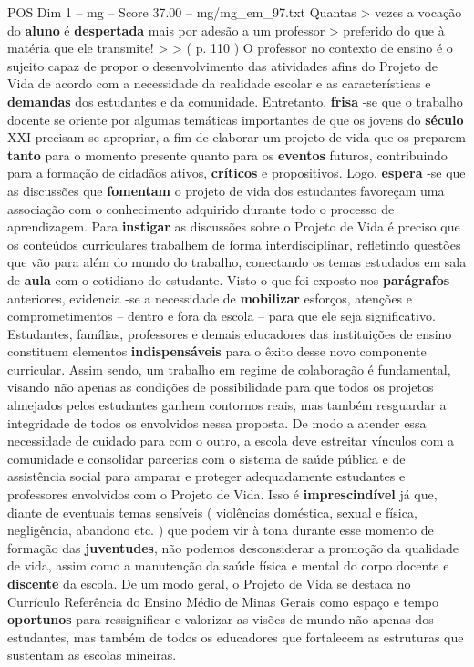 \begin{textsample}{POS Dim 1 – mg – Score 37.00 – mg/mg\_em\_97.txt}
Quantas > vezes a vocação do \textbf{aluno} é \textbf{despertada} mais por adesão a um professor > preferido do que à matéria que ele transmite! > > ( p. 110 ) O professor no contexto de ensino é o sujeito capaz de propor o desenvolvimento das atividades afins do Projeto de Vida de acordo com a necessidade da realidade escolar e as características e \textbf{demandas} dos estudantes e da comunidade.
Entretanto, \textbf{frisa} -se que o trabalho docente se oriente por algumas temáticas importantes de que os jovens do \textbf{século} XXI precisam se apropriar, a fim de elaborar um projeto de vida que os preparem \textbf{tanto} para o momento presente quanto para os \textbf{eventos} futuros, contribuindo para a formação de cidadãos ativos, \textbf{críticos} e propositivos.
Logo, \textbf{espera} -se que as discussões que \textbf{fomentam} o projeto de vida dos estudantes favoreçam uma associação com o conhecimento adquirido durante todo o processo de aprendizagem.
Para \textbf{instigar} as discussões sobre o Projeto de Vida é preciso que os conteúdos curriculares trabalhem de forma interdisciplinar, refletindo questões que vão para além do mundo do trabalho, conectando os temas estudados em sala de \textbf{aula} com o cotidiano do estudante.
Visto o que foi exposto nos \textbf{parágrafos} anteriores, evidencia -se a necessidade de \textbf{mobilizar} esforços, atenções e comprometimentos – dentro e fora da escola – para que ele seja significativo.
Estudantes, famílias, professores e demais educadores das instituições de ensino constituem elementos \textbf{indispensáveis} para o êxito desse novo componente curricular.
Assim sendo, um trabalho em regime de colaboração é fundamental, visando não apenas as condições de possibilidade para que todos os projetos almejados pelos estudantes ganhem contornos reais, mas também resguardar a integridade de todos os envolvidos nessa proposta.
De modo a atender essa necessidade de cuidado para com o outro, a escola deve estreitar vínculos com a comunidade e consolidar parcerias com o sistema de saúde pública e de assistência social para amparar e proteger adequadamente estudantes e professores envolvidos com o Projeto de Vida.
Isso é \textbf{imprescindível} já que, diante de eventuais temas sensíveis ( violências doméstica, sexual e física, negligência, abandono etc. ) que podem vir à tona durante esse momento de formação das \textbf{juventudes}, não podemos desconsiderar a promoção da qualidade de vida, assim como a manutenção da saúde física e mental do corpo docente e \textbf{discente} da escola.
De um modo geral, o Projeto de Vida se destaca no Currículo Referência do Ensino Médio de Minas Gerais como espaço e tempo \textbf{oportunos} para ressignificar e valorizar as visões de mundo não apenas dos estudantes, mas também de todos os educadores que fortalecem as estruturas que sustentam as escolas mineiras.


\end{textsample}
